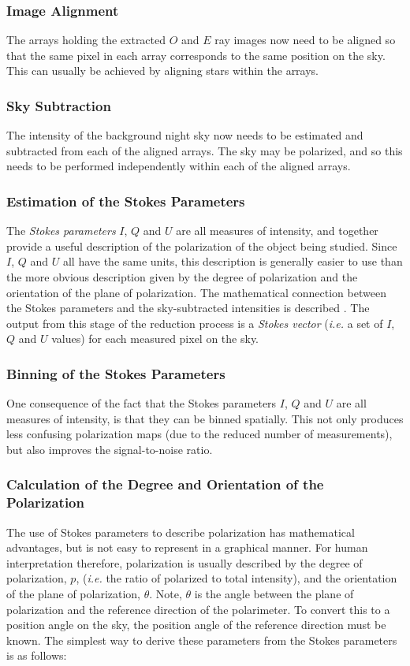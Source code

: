 \documentclass[twoside,11pt]{starlink}
\begin{document}
\subsubsection{Image Alignment}
The arrays holding the extracted $O$ and $E$ ray images now need to be
aligned so that the same pixel in each array corresponds to the same
position on the sky. This can usually be achieved by aligning stars
within the arrays.

\subsubsection{Sky Subtraction}
The intensity of the background night sky now needs to be estimated and
subtracted from each of the aligned arrays. The sky may be polarized, and
so this needs to be performed independently within each of the aligned arrays.

\subsubsection{Estimation of the Stokes Parameters}
The \emph{Stokes parameters} $I$, $Q$ and $U$ are all measures of intensity,
and together provide a useful description of the polarization of the object
being studied. Since $I$, $Q$ and $U$ all have the same units, this
description is generally easier to use than the more obvious description
given by the degree of polarization and the orientation of the plane of
polarization. The mathematical connection between the Stokes parameters
and the sky-subtracted intensities is described . The output from this stage of the reduction process
is a \emph{Stokes vector} (\emph{i.e.} a set of $I$, $Q$ and $U$ values) for each
measured pixel on the sky.

\subsubsection{Binning of the Stokes Parameters}
One consequence of the fact that the Stokes parameters $I$, $Q$ and $U$
are all measures of intensity, is that they can be binned spatially. This
not only produces less confusing polarization maps (due to the reduced
number of measurements), but also improves the signal-to-noise ratio.

\subsubsection{Calculation of the Degree and Orientation of the Polarization}
The use of Stokes parameters to describe polarization has mathematical
advantages, but is not easy to represent in a graphical manner. For human
interpretation therefore, polarization is usually described by the degree
of polarization, $p$, (\emph{i.e.} the ratio of polarized to total intensity),
and the orientation of the plane of polarization, $\theta$. Note,
$\theta$ is the angle between the plane of polarization and the reference
direction of the polarimeter. To convert this to a position angle on the
sky, the position angle of the reference direction must be known. The
simplest way to derive these parameters from the Stokes parameters is as
follows:
\end{document}

